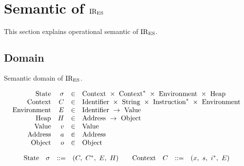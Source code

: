 \section{Semantic of \( \text{IR}_\text{ES} \)}

This section explains operational semantic of \( \text{IR}_\text{ES} \).

\subsection{Domain}

Semantic domain of \( \text{IR}_\text{ES} \).

\[
\begin{array}{rrrl}
\text{State} &
\sigma &
\in &
\mbox{Context}\ \times\ \mbox{Context}^*\
\times\ \mbox{Environment}\ \times\ \mbox{Heap}
\\
\text{Context} & C & \in &
\mbox{Identifier}\ \times\ \mbox{String}\
\times\ \mbox{Instruction}^*\ \times\ \mbox{Environment}
\\
\text{Environment} & E & \in &
\mbox{Identifier}\ \to\ \mbox{Value}
\\
\text{Heap} & H & \in &
\mbox{Address}\ \to\ \mbox{Object}
\\
\text{Value} & v & \in & \mbox{Value}
\\
\text{Address} & a & \in & \mbox{Address}
\\
\text{Object} & o & \in & \mbox{Object}
\\

\end{array}
\]

\[
\begin{array}{ccccccccc}
\text{State} & \sigma & ::= & (C,\ C^*,\ E,\ H) &  &
\text{Context} & C & ::= & (x,\ s,\ i^*,\ E) \\
\end{array}
\]


